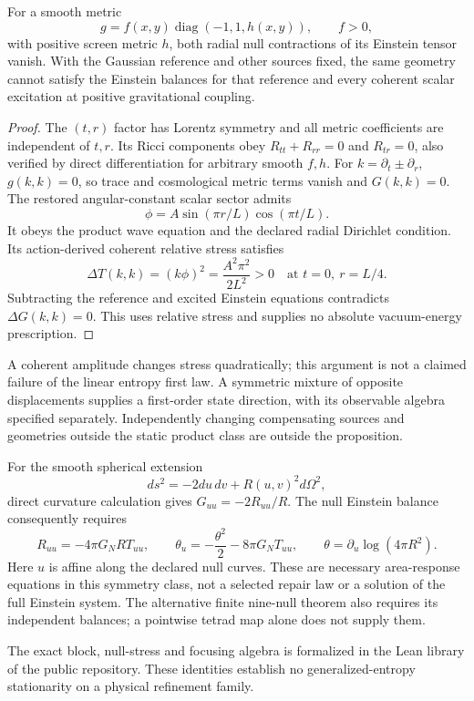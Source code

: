 \begin{proposition}
\label{prop:static-product}
For a smooth metric
\[
 g=f(x,y)\operatorname{diag}(-1,1,h(x,y)),\qquad f>0,
\]
with positive screen metric \(h\), both radial null contractions of its
Einstein tensor vanish. With the Gaussian reference and other sources fixed,
the same geometry cannot satisfy the Einstein balances for that reference
and every coherent scalar excitation at positive gravitational coupling.
\end{proposition}

\begin{proof}
The \((t,r)\) factor has Lorentz symmetry and all metric coefficients are
independent of \(t,r\). Its Ricci components obey
\(R_{tt}+R_{rr}=0\) and \(R_{tr}=0\), also verified by direct differentiation
for arbitrary smooth \(f,h\). For \(k=\partial_t\pm\partial_r\),
\(g(k,k)=0\), so trace and cosmological metric terms vanish and
\(G(k,k)=0\). The restored angular-constant scalar sector admits
\[
 \phi=A\sin(\pi r/L)\cos(\pi t/L).
\]
It obeys the product wave equation and the declared radial Dirichlet
condition. Its action-derived coherent relative stress satisfies
\[
 \Delta T(k,k)=(k\phi)^2
   =\frac{A^2\pi^2}{2L^2}>0
 \quad\text{at }t=0,\ r=L/4.
\]
Subtracting the reference and excited Einstein equations contradicts
\(\Delta G(k,k)=0\). This uses relative stress and supplies no absolute
vacuum-energy prescription.
\end{proof}

A coherent amplitude changes stress quadratically; this argument is not
a claimed failure of the linear entropy first law. A symmetric mixture of
opposite displacements supplies a first-order state direction, with its
observable algebra specified separately. Independently changing compensating
sources and geometries outside the static product class are outside the
proposition.

For the smooth spherical extension
\[
 ds^2=-2du\,dv+R(u,v)^2d\Omega^2,
\]
direct curvature calculation gives \(G_{uu}=-2R_{uu}/R\). The null Einstein
balance consequently requires
\[
 R_{uu}=-4\pi G_NR T_{uu},\qquad
 \theta_u=-\frac{\theta^2}{2}-8\pi G_NT_{uu},\qquad
 \theta=\partial_u\log(4\pi R^2).
\]
Here \(u\) is affine along the declared null curves. These are necessary
area-response equations in this symmetry class, not a selected repair law
or a solution of the full Einstein system. The alternative finite
nine-null theorem also requires its independent balances; a pointwise
tetrad map alone does not supply them.

The exact block, null-stress and focusing algebra is formalized in the Lean
library of the public repository. These identities establish no
generalized-entropy stationarity on a physical refinement family.
